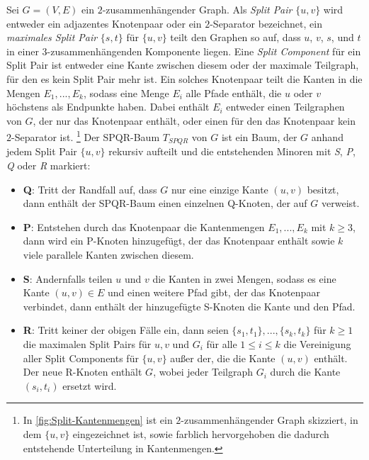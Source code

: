 \begin{definition}
  Sei $G = (V, E)$ ein $2$-zusammenhängender Graph.
  Als \emph{Split Pair} $\{u, v\}$ wird entweder ein adjazentes Knotenpaar oder ein $2$-Separator bezeichnet, ein \emph{maximales Split Pair} $\{s, t\}$ für $\{u, v\}$ teilt den Graphen so auf, dass $u$, $v$, $s$, und $t$ in einer $3$-zusammenhängenden Komponente liegen.
  Eine \emph{Split Component} für ein Split Pair ist entweder eine Kante zwischen diesem oder der maximale Teilgraph, für den es kein Split Pair mehr ist.
  Ein solches Knotenpaar teilt die Kanten in die Mengen $E_1, ..., E_k$, sodass eine Menge $E_i$ alle Pfade enthält, die $u$ oder $v$ höchstens als Endpunkte haben.
  Dabei enthält $E_i$ entweder einen Teilgraphen von $G$, der nur das Knotenpaar enthält, oder einen für den das Knotenpaar kein $2$-Separator ist.
  \footnote {In \Abb \ref{fig:Split-Kantenmengen} ist ein $2$-zusammenhängender Graph skizziert, in dem $\{u, v\}$ eingezeichnet ist, sowie farblich hervorgehoben die dadurch entstehende Unterteilung in Kantenmengen.}
  Der SPQR-Baum $T_{SPQR}$ von $G$ ist ein Baum, der $G$ anhand jedem Split Pair $\{u, v\}$ rekursiv aufteilt und die entstehenden Minoren mit \emph{S}, \emph{P}, \emph{Q} oder \emph{R} markiert:
  \begin{itemize}
    \item \textbf{Q}: Tritt der Randfall auf, dass $G$ nur eine einzige Kante $(u, v)$ besitzt, dann enthält der SPQR-Baum einen einzelnen Q-Knoten, der auf $G$ verweist.
    \item \textbf{P}: Entstehen durch das Knotenpaar die Kantenmengen $E_1, ..., E_k$ mit $k \geq 3$, dann wird ein P-Knoten hinzugefügt, der das Knotenpaar enthält sowie $k$ viele parallele Kanten zwischen diesem.
    \item \textbf{S}: Andernfalls teilen $u$ und $v$ die Kanten in zwei Mengen, sodass es eine Kante $(u, v) \in E$ und einen weitere Pfad gibt, der das Knotenpaar verbindet, dann enthält der hinzugefügte S-Knoten die Kante und den Pfad.
    \item \textbf{R}: Tritt keiner der obigen Fälle ein, dann seien $\{s_1, t_1\}, ..., \{s_k, t_k\}$ für $k \geq 1$ die maximalen Split Pairs für ${u, v}$ und $G_i$ für alle $1 \leq i \leq k$ die Vereinigung aller Split Components für $\{u, v\}$ außer der, die die Kante $(u, v)$ enthält.
                      Der neue R-Knoten enthält $G$, wobei jeder Teilgraph $G_i$ durch die Kante $(s_i, t_i)$ ersetzt wird.
  \end{itemize}
\end{definition}

